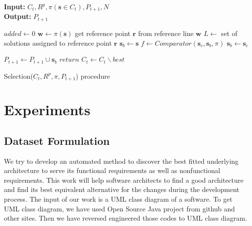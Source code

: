 \documentclass[letterpaper, 10 pt, conference]{ieeeconf}  %
\begin{document}
\begin{algorithm}[!ht] \label{algo_selection}
	
 	\textbf{Input:} $C_t,R^p,\pi(\mathbf{s} \in C_t),P_{t+1},N$\\
 	\textbf{Output:} $P_{t+1}$
	
 	\begin{algorithmic}[1]
    \State $added \gets 0$
    \State $\mathbf{w} \gets \pi(\mathbf{s})$
    \State get reference point $\textbf{r}$ from reference line $\mathbf{w}$
    \State $L \gets $ set of solutions assigned to reference point $\textbf{r}$
    \State $\mathbf{s}_b \gets \mathbf{s}$
    \State $ f \gets Comparator(\mathbf{s}_c,\mathbf{s}_b,\pi)$
    \State $\mathbf{s}_b \gets \mathbf{s}_c$
    \EndIf
    
    \EndFor
    \State $P_{t+1} \gets P_{t+1} \cup \mathbf{s}_b$
    \State $return$
    \EndIf
    \State $C_{t} \gets C_{t}\backslash best $
    
    
    
    \EndFor
	\end{algorithmic}
    \caption{Selection($C_t,R^p,\pi,P_{t+1}$) procedure}
 	\label{alg:selection}
 \end{algorithm}
 


\section{Experiments}
\subsection{Dataset Formulation}
We try to develop an automated method to discover the best fitted underlying architecture to serve its functional requirements as well as nonfunctional requirements. This work will help software architects to find a good architecture and find its best equivalent alternative for the changes during the development process. The input of our work is a UML class diagram of a software. To get UML class diagram, we have used Open Source Java project from github and other sites. Then we have reversed engineered those codes to UML class diagram. 
\end{document}
